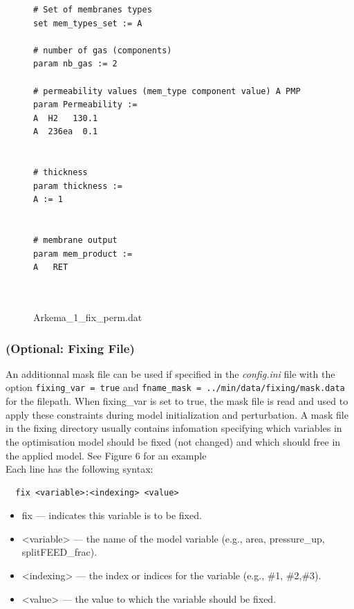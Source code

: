 \documentclass[12pt]{article}
\theoremstyle{definition}
\theoremstyle{definition}
\theoremstyle{remark}
\theoremstyle{remark}
\theoremstyle{definition}
\theoremstyle{remark}
\begin{document}
\begin{figure}[ht]
	
\begin{mdframed}
	\begin{verbatim}
# Set of membranes types
set mem_types_set := A 

# number of gas (components)
param nb_gas := 2

# permeability values (mem_type component value) A PMP
param Permeability :=
A  H2	130.1
A  236ea  0.1 


# thickness
param thickness :=
A := 1 


# membrane output
param mem_product :=
A   RET

		
	\end{verbatim}
	
\end{mdframed}

	\caption{Arkema\_1\_fix\_perm.dat}
\end{figure}

\subsubsection{(Optional: Fixing File)}
An additionnal mask file can be used if specified in the \emph{config.ini} file with the option \texttt{fixing\_var = true} and \texttt{fname\_mask = ../min/data/fixing/mask.data} for the filepath. When fixing\_var is set to true, the mask file is read and used to apply these constraints during model initialization and perturbation.
A mask file in the fixing directory usually contains infomation specifying which variables in the optimisation model should be fixed (not changed) and which should free in the applied model. See Figure 6 for an example\\

Each line has the following syntax: 
\begin{verbatim}
  fix <variable>:<indexing> <value>
\end{verbatim}
\begin{itemize}
\item fix — indicates this variable is to be fixed.
\item <variable> — the name of the model variable (e.g., area, pressure\_up, splitFEED\_frac).
\item <indexing> — the index or indices for the variable (e.g., \#1, \#2,\#3).
\item <value> — the value to which the variable should be fixed.
	
\end{itemize}
\end{document}
